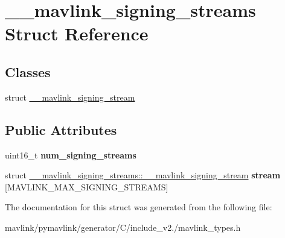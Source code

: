 \hypertarget{struct____mavlink__signing__streams}{}\section{\+\_\+\+\_\+mavlink\+\_\+signing\+\_\+streams Struct Reference}
\label{struct____mavlink__signing__streams}
\subsection*{Classes}
\begin{DoxyCompactItemize}
\item 
struct \hyperlink{struct____mavlink__signing__streams_1_1____mavlink__signing__stream}{\+\_\+\+\_\+mavlink\+\_\+signing\+\_\+stream}
\end{DoxyCompactItemize}
\subsection*{Public Attributes}
\begin{DoxyCompactItemize}
\item 
\mbox{\label{struct____mavlink__signing__streams_a21844f3fe728695a8e33a4b003591979}} 
uint16\+\_\+t {\bfseries num\+\_\+signing\+\_\+streams}
\item 
\mbox{\label{struct____mavlink__signing__streams_a76b029e55c2ea2d8a90b7dd1c4776ffb}} 
struct \hyperlink{struct____mavlink__signing__streams_1_1____mavlink__signing__stream}{\+\_\+\+\_\+mavlink\+\_\+signing\+\_\+streams\+::\+\_\+\+\_\+mavlink\+\_\+signing\+\_\+stream} {\bfseries stream} \mbox{[}M\+A\+V\+L\+I\+N\+K\+\_\+\+M\+A\+X\+\_\+\+S\+I\+G\+N\+I\+N\+G\+\_\+\+S\+T\+R\+E\+A\+MS\mbox{]}
\end{DoxyCompactItemize}


The documentation for this struct was generated from the following file\+:\begin{DoxyCompactItemize}
\item 
mavlink/pymavlink/generator/\+C/include\+\_\+v2./mavlink\+\_\+types.\+h\end{DoxyCompactItemize}

